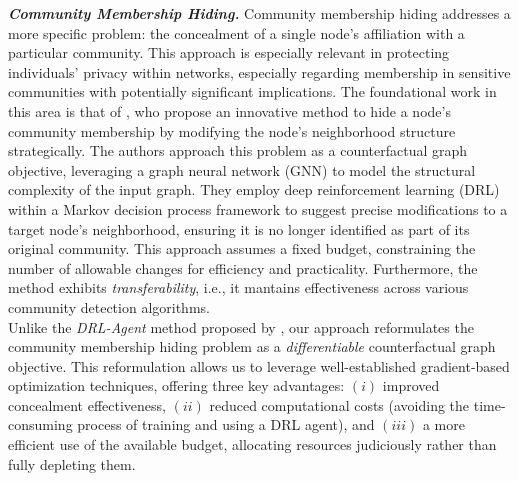 \textbf{\textit{Community Membership Hiding.}} Community membership hiding addresses a more specific problem: the concealment of a single node's affiliation with a particular community. This approach is especially relevant in protecting individuals’ privacy within networks, especially regarding membership in sensitive communities with potentially significant implications. The foundational work in this area is that of \citet{bernini2024kdd}, who propose an innovative method to hide a node's community membership by modifying the node's neighborhood structure strategically. The authors approach this problem as a counterfactual graph objective, leveraging a graph neural network (GNN) to model the structural complexity of the input graph. They employ deep reinforcement learning (DRL) within a Markov decision process framework to suggest precise modifications to a target node’s neighborhood, ensuring it is no longer identified as part of its original community. This approach assumes a fixed budget, constraining the number of allowable changes for efficiency and practicality. Furthermore, the method exhibits \emph{transferability}, i.e., it mantains effectiveness across various community detection algorithms. \\
Unlike the \textit{DRL-Agent} method proposed by \citet{bernini2024kdd}, our approach reformulates the community membership hiding problem as a \textit{differentiable} counterfactual graph objective. This reformulation allows us to leverage well-established gradient-based optimization techniques, offering three key advantages: $(i)$ improved concealment effectiveness, $(ii)$ reduced computational costs (avoiding the time-consuming process of training and using a DRL agent), and $(iii)$ a more efficient use of the available budget, allocating resources judiciously rather than fully depleting them.